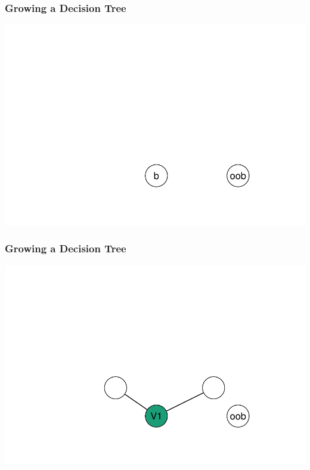 \documentclass[xcolor=svgnames]{beamer}\usepackage[]{graphicx}\usepackage[]{color}
\newenvironment{knitrout}{}{} %
\begin{document}
\begin{frame}
\frametitle{Growing a Decision Tree}

\begin{knitrout}\footnotesize
{}\color{fgcolor}

{\centering \includegraphics[width=.9\linewidth]{figures/treeDiagram0-1} 

}



\end{knitrout}


\end{frame}
\begin{frame}
\frametitle{Growing a Decision Tree}

\begin{knitrout}\footnotesize
{}\color{fgcolor}

{\centering \includegraphics[width=.9\linewidth]{figures/treeDiagram1-1} 

}



\end{knitrout}


\end{frame}
\end{document}

